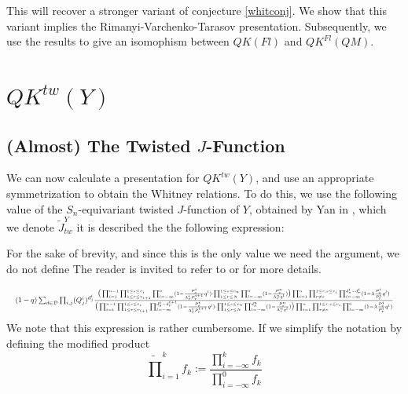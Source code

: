 \documentclass[11pt,letterpaper]{amsart}
\begin{document}
This will recover a stronger variant of conjecture \ref{whitconj}. We show that this variant implies the Rimanyi-Varchenko-Tarasov presentation. Subsequently, we use the results to give an isomophism between $QK(Fl)$ and $QK^{Fl}(QM)$. 





\section{$QK^{tw}(Y)$}
\subsection{(Almost) The Twisted $J$-Function}
We can now calculate a presentation for $QK^{tw}(Y)$, and use an appropriate symmetrization to obtain the Whitney relations. To do this, we use the following value of the $S_n$-equivariant twisted $J$-function of $Y$, obtained by Yan in \cite{Xiaohan}, which we denote $\tilde{J}_{tw}^Y$ it is described the the following expression:


\begin{remark}
    For the sake of brevity, and since this is the only value we need the argument, we do not define  The reader is invited to refer to \cite{me} or \cite{Xiaohan} for more details. 
\end{remark}


\begin{equation}\label{jf}
\resizebox{\hsize}{!}{$
(1-q)\sum_{d\in \mathcal{D}} \prod_{i,j} (Q^i_{j})^{d^i_{j}}\frac{\big(\prod_{i=1}^{n-1}\prod_{1\leq r\leq v_{i+1}}^{1\leq s\leq v_i}\prod_{l=-\infty}^{0}(1-\frac{P^i_{s}}{\Lambda^{i}_{r}P^{i+1}_r}q^l)\cdot\prod_{1\leq r\leq N}^{1\leq s\leq v_n}\prod_{l=-\infty}^{0}(1-\frac{P^n_{s}}{\Lambda^{n}_{r}q^l})\big)\prod_{i=1}^n\prod_{r\neq s}^{1\leq r,s\leq v_i}\prod_{l=-\infty}^{d^i_{s}-d^i_{r}}(1-\lambda\frac{P^i_{s}}{P^i_{r}}q^l)}{\big(\prod_{i=1}^{n-1}\prod_{1\leq r\leq v_{i+1}}^{1\leq s\leq v_i}\prod_{l=-\infty}^{d^i_{s}-d^{i+1}_r}(1-\frac{P^i_{s}}{\Lambda^{i}_{r}P^{i+1}_r}q^l)\cdot\prod_{1\leq r\leq N}^{1\leq s\leq v_n}\prod_{l=-\infty}^{d^n_{s}}(1-\frac{P^n_{s}}{\Lambda^{n}_{r}q^l})\big)\prod_{i=1}^n\prod_{r\neq s}^{1\leq r,s\leq v_i}\prod_{l=-\infty}^{0}(1-\lambda\frac{P^i_{s}}{P^i_{r}}q^l)}$}
\end{equation}
 We note that this expression is rather cumbersome. If we simplify the notation by defining the modified product $$\widetilde{\prod}_{i=1}^k f_k:=\frac{\prod_{i=-\infty}^k f_k}{\prod_{i=-\infty}^0 f_k}$$
\end{document}
